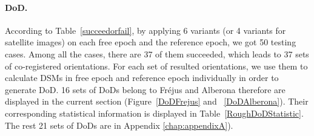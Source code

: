 %
%		
%		

\paragraph{\ac{DoD}.}
\label{sec:RoughDoDMainBody}
According to Table~\ref{succeedorfail}, by applying 6 variants (or 4 variants for satellite images) on each free epoch and the reference epoch, we got 50 testing cases. Among all the cases, there are 37 of them succeeded, which leads to 37 sets of co-registered orientations. For each set of resulted orientations, we use them to calculate DSMs in free epoch and reference epoch individually in order to generate \ac{DoD}.
16 sets of \ac{DoD}s belong to Fr{\'e}jus and Alberona therefore are displayed in the current section (Figure~\ref{DoDFrejus} and ~\ref{DoDAlberona}). Their corresponding statistical information is displayed in Table~\ref{RoughDoDStatistic}. The rest 21 sets of \ac{DoD}s are in Appendix \ref{chap:appendixA}). \\

